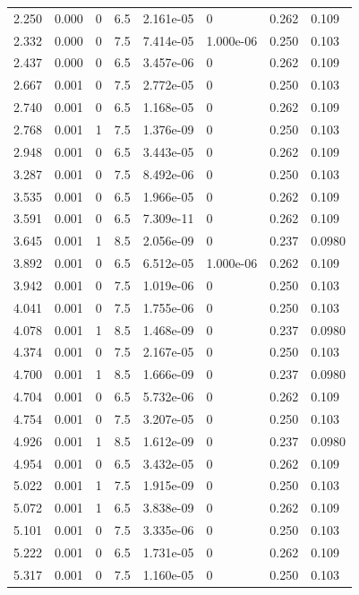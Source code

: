 \documentclass[preview]{standalone}
\begin{document}
{{\begin{tabular}{L{1.2cm}C{1.2cm} C{0.3cm}C{0.5cm} C{1.4cm}C{1.4cm} C{1.4cm}C{1.4cm}}
  2.250  &  0.000  & 0     & 6.5 &  2.161e-05  & 0  & 0.262 &  0.109   \\ 
  2.332  &  0.000  & 0     & 7.5 &  7.414e-05  & 1.000e-06  & 0.250 &  0.103   \\ 
  2.437  &  0.000  & 0     & 6.5 &  3.457e-06  & 0  & 0.262 &  0.109   \\ 
  2.667  &  0.001  & 0     & 7.5 &  2.772e-05  & 0  & 0.250 &  0.103   \\ 
  2.740  &  0.001  & 0     & 6.5 &  1.168e-05  & 0  & 0.262 &  0.109   \\ 
  2.768  &  0.001  & 1     & 7.5 &  1.376e-09  & 0  & 0.250 &  0.103   \\ 
  2.948  &  0.001  & 0     & 6.5 &  3.443e-05  & 0  & 0.262 &  0.109   \\ 
  3.287  &  0.001  & 0     & 7.5 &  8.492e-06  & 0  & 0.250 &  0.103   \\ 
  3.535  &  0.001  & 0     & 6.5 &  1.966e-05  & 0  & 0.262 &  0.109   \\ 
  3.591  &  0.001  & 0     & 6.5 &  7.309e-11  & 0  & 0.262 &  0.109   \\ 
  3.645  &  0.001  & 1     & 8.5 &  2.056e-09  & 0  & 0.237 &  0.0980   \\ 
  3.892  &  0.001  & 0     & 6.5 &  6.512e-05  & 1.000e-06  & 0.262 &  0.109   \\ 
  3.942  &  0.001  & 0     & 7.5 &  1.019e-06  & 0  & 0.250 &  0.103   \\ 
  4.041  &  0.001  & 0     & 7.5 &  1.755e-06  & 0  & 0.250 &  0.103   \\ 
  4.078  &  0.001  & 1     & 8.5 &  1.468e-09  & 0  & 0.237 &  0.0980   \\ 
  4.374  &  0.001  & 0     & 7.5 &  2.167e-05  & 0  & 0.250 &  0.103   \\ 
  4.700  &  0.001  & 1     & 8.5 &  1.666e-09  & 0  & 0.237 &  0.0980   \\ 
  4.704  &  0.001  & 0     & 6.5 &  5.732e-06  & 0  & 0.262 &  0.109   \\ 
  4.754  &  0.001  & 0     & 7.5 &  3.207e-05  & 0  & 0.250 &  0.103   \\ 
  4.926  &  0.001  & 1     & 8.5 &  1.612e-09  & 0  & 0.237 &  0.0980   \\ 
  4.954  &  0.001  & 0     & 6.5 &  3.432e-05  & 0  & 0.262 &  0.109   \\ 
  5.022  &  0.001  & 1     & 7.5 &  1.915e-09  & 0  & 0.250 &  0.103   \\ 
  5.072  &  0.001  & 1     & 6.5 &  3.838e-09  & 0  & 0.262 &  0.109   \\ 
  5.101  &  0.001  & 0     & 7.5 &  3.335e-06  & 0  & 0.250 &  0.103   \\ 
  5.222  &  0.001  & 0     & 6.5 &  1.731e-05  & 0  & 0.262 &  0.109   \\ 
  5.317  &  0.001  & 0     & 7.5 &  1.160e-05  & 0  & 0.250 &  0.103   \\ 
\hline 
\end{tabular} 

}}
\end{document}
